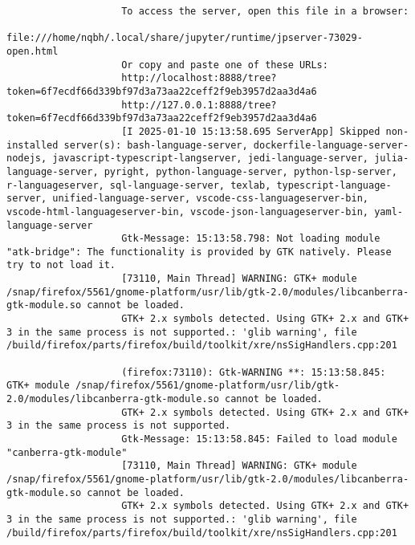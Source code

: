 \documentclass{article}
\begin{document}
\begin{enumerate}
\begin{itemize}
\begin{itemize}
\begin{itemize}
\begin{verbatim}
					To access the server, open this file in a browser:
					file:///home/nqbh/.local/share/jupyter/runtime/jpserver-73029-open.html
					Or copy and paste one of these URLs:
					http://localhost:8888/tree?token=6f7ecdf66d339bf97d3a73aa22ceff2f9eb3957d2aa3d4a6
					http://127.0.0.1:8888/tree?token=6f7ecdf66d339bf97d3a73aa22ceff2f9eb3957d2aa3d4a6
					[I 2025-01-10 15:13:58.695 ServerApp] Skipped non-installed server(s): bash-language-server, dockerfile-language-server-nodejs, javascript-typescript-langserver, jedi-language-server, julia-language-server, pyright, python-language-server, python-lsp-server, r-languageserver, sql-language-server, texlab, typescript-language-server, unified-language-server, vscode-css-languageserver-bin, vscode-html-languageserver-bin, vscode-json-languageserver-bin, yaml-language-server
					Gtk-Message: 15:13:58.798: Not loading module "atk-bridge": The functionality is provided by GTK natively. Please try to not load it.
					[73110, Main Thread] WARNING: GTK+ module /snap/firefox/5561/gnome-platform/usr/lib/gtk-2.0/modules/libcanberra-gtk-module.so cannot be loaded.
					GTK+ 2.x symbols detected. Using GTK+ 2.x and GTK+ 3 in the same process is not supported.: 'glib warning', file /build/firefox/parts/firefox/build/toolkit/xre/nsSigHandlers.cpp:201
					
					(firefox:73110): Gtk-WARNING **: 15:13:58.845: GTK+ module /snap/firefox/5561/gnome-platform/usr/lib/gtk-2.0/modules/libcanberra-gtk-module.so cannot be loaded.
					GTK+ 2.x symbols detected. Using GTK+ 2.x and GTK+ 3 in the same process is not supported.
					Gtk-Message: 15:13:58.845: Failed to load module "canberra-gtk-module"
					[73110, Main Thread] WARNING: GTK+ module /snap/firefox/5561/gnome-platform/usr/lib/gtk-2.0/modules/libcanberra-gtk-module.so cannot be loaded.
					GTK+ 2.x symbols detected. Using GTK+ 2.x and GTK+ 3 in the same process is not supported.: 'glib warning', file /build/firefox/parts/firefox/build/toolkit/xre/nsSigHandlers.cpp:201
					

\end{verbatim}
\end{itemize}
\end{itemize}
\end{itemize}
\end{enumerate}
\end{document}
